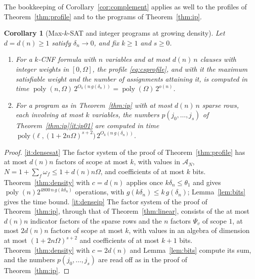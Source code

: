 \documentclass[11pt,reqno]{amsart}
\numberwithin{equation}{section}
\theoremstyle{plain}
\newtheorem{corollary}[theorem]{Corollary}
\theoremstyle{definition}
\theoremstyle{remark}
\DeclareMathOperator{\poly}{poly}
\newcommand{\A}{\mathcal{A}}
\begin{document}
The bookkeeping of Corollary~\ref{cor:complement} applies as well to the profiles of Theorem~\ref{thm:profile} and
to the programs of Theorem~\ref{thm:ip}.

\begin{corollary}[Max-$k$-SAT and integer programs at growing density]\label{cor:densitysat}
Let $d=d(n)\ge1$ satisfy $\delta_n\to0$, and fix $k\ge1$ and $s\ge0$.
\begin{enumerate}[label=(\roman*),leftmargin=2.2em]
\item\label{it:densesat} For a $k$-CNF formula with $n$ variables and at most
$d(n)\,n$ clauses with integer weights in $[0,\Omega]$, the profile
\eqref{eq:csprofile}, and with it the maximum satisfiable weight and the
number of assignments attaining it, is computed in time
$\poly(n,\Omega)\,2^{O_k(n\,g(\delta_n))}=\poly(\Omega)\,2^{o(n)}$.
\item\label{it:denseip} For a program as in Theorem~\ref{thm:ip} with at most
$d(n)\,n$ sparse rows, each involving at most $k$ variables, the numbers
$p(j_0,\dots,j_s)$ of Theorem~\ref{thm:ip}\ref{it:ip01} are computed in time
$\poly\bigl(\ell,(1+2n\Omega)^{s+2}\bigr)\,2^{O_{k}(n\,g(\delta_n))}$.
\end{enumerate}
\end{corollary}

\begin{proof}
\ref{it:densesat} The factor system of the proof of Theorem~\ref{thm:profile}
has at most $d(n)n$ factors of scope at most $k$, with values in $\A_N$,
$N=1+\sum_f\omega_f\le1+d(n)n\Omega$, and coefficients of at most $k$ bits.
Theorem~\ref{thm:density} with $c=d(n)$ applies once $k\delta_n\le\theta_1$ and gives
$\poly(n)2^{4800\,n\,g(k\delta_n)}$ operations, with $g(k\delta_n)\le k\,g(\delta_n)$;
Lemma~\ref{lem:bits} gives the time bound.
\ref{it:denseip} The factor system of the proof of Theorem~\ref{thm:ip}, through
that of Theorem~\ref{thm:linear}, consists of the at most $d(n)n$ indicator
factors of the sparse rows and the $n$ factors $\Psi_v$ of scope $1$, at most
$2d(n)n$ factors of scope at most $k$, with values in an algebra of dimension
at most $(1+2n\Omega)^{s+2}$ and coefficients of at most $k+1$ bits.
Theorem~\ref{thm:density} with $c=2d(n)$ and Lemma~\ref{lem:bits} compute its
sum, and the numbers $p(j_0,\dots,j_s)$ are read off as in the proof of
Theorem~\ref{thm:ip}.
\end{proof}
\end{document}
